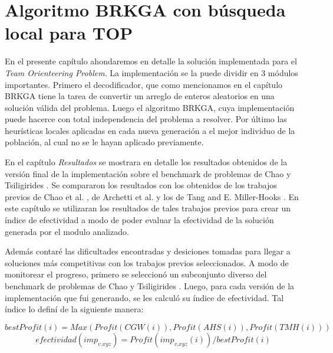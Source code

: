 
\chapter{Algoritmo BRKGA con búsqueda local para TOP}

En el presente capítulo ahondaremos en detalle la solución implementada para el \textit{Team Orienteering Problem}. La implementación se la puede dividir en 3 módulos importantes. Primero el decodificador, que como mencionamos en el capítulo BRKGA tiene la tarea de convertir un arreglo de enteros aleatorios en una solución válida del problema. Luego el algoritmo BRKGA, cuya implementación puede hacerce con total independencia del problema a resolver. Por último las heurísticas locales aplicadas en cada nueva generación a el mejor individuo de la población, al cual no se le hayan aplicado previamente. 

\bigskip

En el capítulo \textit{Resultados} se mostrara en detalle los resultados obtenidos de la versión final de la implementación sobre el benchmark de problemas de Chao y Tsiligirides \cite{IntancesChaoTsiligirides}. Se compararon los resultados con los obtenidos de los trabajos previos de Chao et al. \cite{ChaoGoldenWasil}, de Archetti et al. \cite{ArchettiHertzSperanza} y los de Tang and E. Miller-Hooks \cite{TangMillerHooks}. En este capítulo se utilizaran los resultados de tales trabajos previos para crear un índice de efectividad a modo de poder evaluar la efectividad de la solución generada por el modulo analizado.

\bigskip

Además contaré las dificultades encontradas y desiciones tomadas para llegar a soluciones más competitivas con los trabajos previos seleccionados. A modo de monitorear el progreso, primero se seleccionó un subconjunto diverso del benchmark de problemas de Chao y Tsiligirides \cite{IntancesChaoTsiligirides}. Luego, para cada versión de la implementación que fui generando, se les calculó su índice de efectividad. Tal índice lo definí de la siguiente manera:

\begin{equation*}
bestProfit(i) = Max(Profit(CGW(i)), Profit(AHS(i)), Profit(TMH(i)))
\end{equation*}
\begin{equation*}
efectividad(imp_{v.xyz}) = Profit(imp_{v.xyz}(i)) / bestProfit(i)
\end{equation*}

\bigskip


